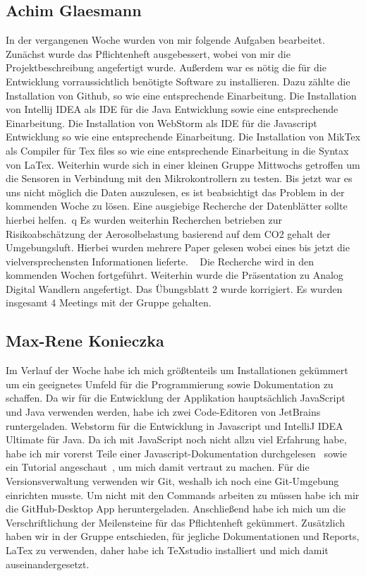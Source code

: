 \documentclass[]{article}
\begin{document}
\subsection{Achim Glaesmann}
In der vergangenen Woche wurden von mir folgende Aufgaben bearbeitet. Zunächst wurde das Pflichtenheft ausgebessert, wobei von mir die Projektbeschreibung angefertigt wurde.
Außerdem war es nötig die für die Entwicklung vorraussichtlich benötigte Software zu installieren. 
Dazu zählte die Installation von Github, so wie eine entsprechende Einarbeitung. Die Installation von Intellij IDEA als IDE für die Java Entwicklung sowie eine entsprechende Einarbeitung.
Die Installation von WebStorm als IDE für die Javascript Entwicklung so wie eine entsprechende Einarbeitung. Die Installation von MikTex als Compiler für Tex files so wie eine entsprechende 
Einarbeitung in die Syntax von LaTex. Weiterhin wurde sich in einer kleinen Gruppe Mittwochs getroffen um die Sensoren in Verbindung mit den Mikrokontrollern zu testen. Bis 
jetzt war es uns nicht möglich die Daten auszulesen, es ist beabsichtigt das Problem in der kommenden Woche zu lösen. Eine ausgiebige Recherche der Datenblätter sollte hierbei
helfen.~\cite{datasheetsht21}q Es wurden weiterhin Recherchen betrieben zur Risikoabschätzung der Aerosolbelastung basierend auf dem CO2 gehalt der Umgebungsluft. Hierbei wurden mehrere Paper gelesen wobei 
eines bis jetzt die vielversprechensten Informationen lieferte. ~\cite{co2letter} Die Recherche wird in den kommenden Wochen fortgeführt. Weiterhin wurde die Präsentation zu Analog Digital Wandlern 
angefertigt. Das Übungsblatt 2 wurde korrigiert. Es wurden insgesamt 4 Meetings mit der Gruppe gehalten.

\subsection{Max-Rene Konieczka}
Im Verlauf der Woche habe ich mich größtenteils um Installationen gekümmert um ein geeignetes Umfeld für die Programmierung sowie Dokumentation zu schaffen. Da wir für die Entwicklung der Applikation hauptsächlich JavaScript und Java verwenden werden, habe ich zwei Code-Editoren von JetBrains runtergeladen. Webstorm für die Entwicklung in Javascript und IntelliJ IDEA Ultimate für Java. Da ich mit JavaScript noch nicht allzu viel Erfahrung habe, habe ich mir vorerst Teile einer Javascript-Dokumentation durchgelesen~\cite{javascript_doc} sowie ein Tutorial angeschaut~\cite{javascript_tut}, um mich damit vertraut zu machen.
Für die Versionsverwaltung verwenden wir Git, weshalb ich noch eine Git-Umgebung einrichten musste. Um nicht mit den Commands arbeiten zu müssen habe ich mir die GitHub-Desktop App heruntergeladen. 
Anschließend habe ich mich um die Verschriftlichung der Meilensteine für das Pflichtenheft gekümmert. Zusätzlich haben wir in der Gruppe entschieden, für jegliche Dokumentationen und Reports, LaTex zu verwenden, daher habe ich TeXstudio installiert und mich damit auseinandergesetzt. 
\end{document}

